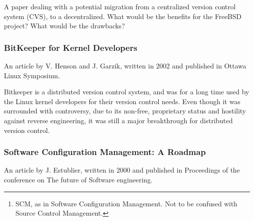 \documentclass{article}
\begin{document}
A paper dealing with a potential migration from a centralized version
control system (CVS), to a decentralized. What would be the benefits for
the FreeBSD project? What would be the drawbacks?

\subsubsection{BitKeeper for Kernel Developers}

An article by V. Henson and J. Garzik, written in 2002 and published in
Ottawa Linux Symposium\cite{henson02}.

\begin{abstract}
 BitKeeper is a revolutionary new distributed source control management
 suite which is ideal for Linux kernel development. BitKeeper provides tools
 which automate and simplify many common kernel development tasks. In this
 paper, we describe basic BitKeeper concepts and operations, BitKeeper
 solutions for common kernel development problems, and a workflow for
 interacting with other Linux developers using BitKeeper. We also discuss
 some of BitKeeper's shortcomings and what is being done to correct them. We
 conclude that BitKeeper can dramatically imrpove the efficiency of Linux
 kernel developers.
\end{abstract}

Bitkeeper is a distributed version control system, and was for a long time
used by the Linux kernel developers for their version control needs. Even
though it was surrounded with controversy, due to its non-free, proprietary
status and hostility against reverse engineering, it was still a major
breakthrough for distributed version control. 

\subsubsection{Software Configuration Management: A Roadmap}

An article by J. Estublier, written in 2000 and published in Proceedings of
the conference on The future of Software engineering\cite{estublier00}.

\begin{abstract}
 This paper, in the first chapter summarizes the state of the art in
 SCM\footnote{
  SCM, as in Software Configuration Management. Not to be confused with
  Source Control Management.
 }, showing the evolution along the last 25 years. Chapter 2 shows the
 current research work under way in the area. In chapter 3, the challenges
 SCM has to take up, as well as SCM future research are discussed.
\end{abstract}
\end{document}
